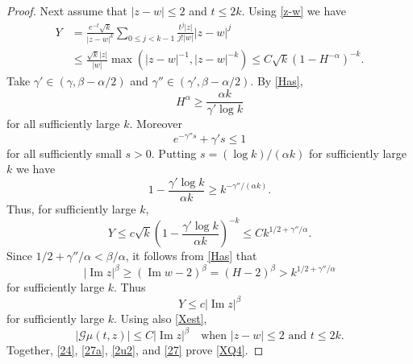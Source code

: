 \documentclass[11pt]{amsart}
\theoremstyle{definition}
\theoremstyle{remark}
\numberwithin{equation}{section}
\begin{document}
\begin{proof}
Next assume that $|z-w|\le 2$ and $t\le 2k$.  Using \eqref{z-w} we have
\begin{align*}
Y &=  \frac{e^{-t}\sqrt{k}}{|z-w|^k}\sum_{0 \le j < k-1} \frac{t^j|z|}{j!|w|}|z-w|^j \\
&\le \frac{\sqrt{k} |z|}{|w|} \max\left(|z-w|^{-1}, |z-w|^{-k}\right)  \le C\sqrt{k} (1-H^{-\alpha})^{-k}.
\end{align*}
Take $\gamma' \in (\gamma, \beta - \alpha/2)$ and $\gamma'' \in (\gamma',\beta-\alpha/2)$.   By \eqref{Has},
$$
H^\alpha \ge \frac{\alpha k}{\gamma' \log k}
$$
for all sufficiently large $k$.  Moreover
$$
e^{-\gamma'' s} + \gamma' s \le 1
$$
for all sufficiently small $s>0$.  Putting $s = (\log k)/(\alpha k)$ for sufficiently large $k$ we have
$$
1- \frac{\gamma' \log k}{\alpha k} \ge k^{-\gamma''/(\alpha k)}.
$$
Thus, for sufficiently large $k$,
$$
Y  \le c\sqrt{k} \left(1- \frac{\gamma' \log k}{\alpha k} \right)^{-k} \le C k^{1/2 + \gamma''/\alpha}.
$$
Since $1/2 + \gamma''/\alpha < \beta/\alpha$, it follows from \eqref{Has} that
$$
|{\operatorname{Im}} z|^\beta \ge ({\operatorname{Im}} w -2)^\beta = (H-2)^\beta  > k^{1/2+\gamma''/\alpha}
$$
for sufficiently large $k$.  Thus
$$
Y \le c |{\operatorname{Im}} z|^\beta
$$
for sufficiently large $k$.  Using also \eqref{Xest},
\begin{equation}
|\mathcal G\mu(t,z)|  \le C |{\operatorname{Im}} z|^\beta \quad \text{when $|z-w| \le 2$ and $t \le 2k$}. \label{27}
\end{equation}
Together, \eqref{24}, \eqref{27a}, \eqref{2u2}, and \eqref{27}
prove \eqref{XQ4}.
\smallskip


\end{proof}
\end{document}
